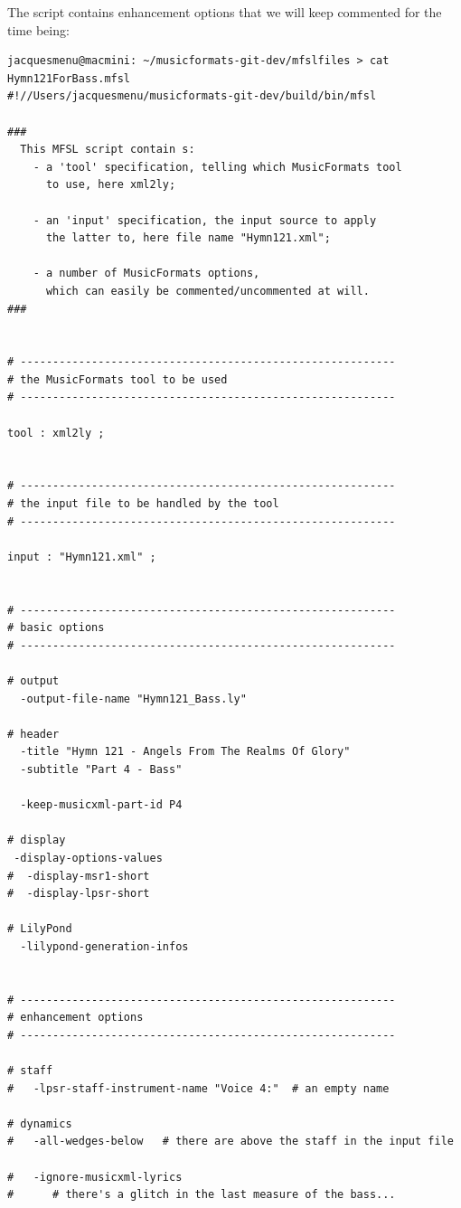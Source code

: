 The  script contains enhancement options that we will keep commented for the time being:
\begin{lstlisting}[language=MFSL]
jacquesmenu@macmini: ~/musicformats-git-dev/mfslfiles > cat Hymn121ForBass.mfsl
#!//Users/jacquesmenu/musicformats-git-dev/build/bin/mfsl

###
  This MFSL script contain s:
    - a 'tool' specification, telling which MusicFormats tool
      to use, here xml2ly;

    - an 'input' specification, the input source to apply
      the latter to, here file name "Hymn121.xml";

    - a number of MusicFormats options,
      which can easily be commented/uncommented at will.
###


# ----------------------------------------------------------
# the MusicFormats tool to be used
# ----------------------------------------------------------

tool : xml2ly ;


# ----------------------------------------------------------
# the input file to be handled by the tool
# ----------------------------------------------------------

input : "Hymn121.xml" ;


# ----------------------------------------------------------
# basic options
# ----------------------------------------------------------

# output
  -output-file-name "Hymn121_Bass.ly"

# header
  -title "Hymn 121 - Angels From The Realms Of Glory"
  -subtitle "Part 4 - Bass"

  -keep-musicxml-part-id P4

# display
 -display-options-values
#  -display-msr1-short
#  -display-lpsr-short

# LilyPond
  -lilypond-generation-infos


# ----------------------------------------------------------
# enhancement options
# ----------------------------------------------------------

# staff
#   -lpsr-staff-instrument-name "Voice 4:"  # an empty name

# dynamics
#   -all-wedges-below   # there are above the staff in the input file

#   -ignore-musicxml-lyrics
#      # there's a glitch in the last measure of the bass...
\end{lstlisting}


